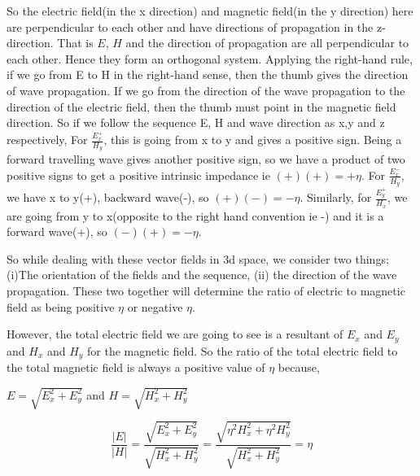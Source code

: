 So the electric field(in the x direction) and magnetic field(in the y direction) here are perpendicular to each other and have directions of propagation in the z-direction. That is $E$, $H$ and the direction of propagation are all perpendicular to each other. Hence they form an orthogonal system. Applying the right-hand rule, if we go from E to H in the right-hand sense, then the thumb gives the direction of wave propagation. If we go from the direction of the wave propagation to the direction of the electric field, then the thumb must point in the magnetic field direction.
So if we follow the sequence E, H and wave direction as x,y and z respectively, For $\frac{E_x^+}{H_y}$, this is going from x to y and gives a positive sign. Being a forward travelling wave gives another positive sign, so we have a product of two positive signs to get a positive intrinsic impedance ie $(+)(+) = +\eta$. For $\frac{E_x^-}{H_y}$, we have x to y(+), backward wave(-), so $(+)(-) = -\eta$. Similarly, for $\frac{E_y^+}{H_x}$, we are going from y to x(opposite to the right hand convention ie -) and it is a forward wave(+), so $(-)(+) = -\eta$.

So while dealing with these vector fields in 3d space, we consider two things; (i)The orientation of the fields and the sequence, (ii) the direction of the wave propagation. These two together will determine the ratio of electric to magnetic field as being positive $\eta$ or negative $\eta$.

However, the total electric field we are going to see is a resultant of $E_x$ and $E_y$ and $H_x$ and $H_y$ for the magnetic field. So the ratio of the total electric field to the total magnetic field is always a positive value of $\eta$ because,
\begin{center}
$E = \sqrt{E_x^2 + E_y^2}$ and $H = \sqrt{H_x^2 + H_y^2}$
\end{center}
\begin{dmath*}
\frac{|E|}{|H|}=\frac{\sqrt{E_x^2 + E_y^2}}{\sqrt{H_x^2 + H_y^2}} = \frac{\sqrt{\eta ^2H_x^2 + \eta ^2H_y^2}}{\sqrt{H_x^2 + H_y^2}}=\eta
\end{dmath*}

